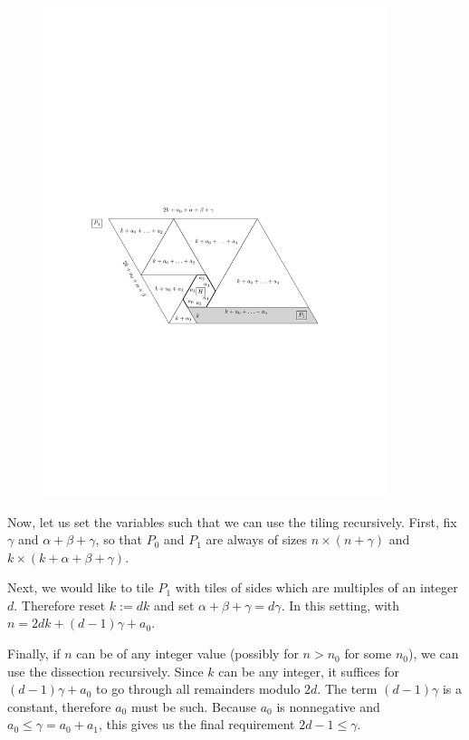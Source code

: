 \begin{figure}[htb]
\centering
\includegraphics[width=0.9\textwidth]{img/core_tiling1.pdf}
\caption{}
\label{fig:core-tiling1}
\end{figure}

Now, let us set the variables such that we can use the tiling recursively. First, fix $\gamma$ and $\alpha+\beta+\gamma$, so that $P_0$ and $P_1$ are always of sizes $n \times (n+\gamma)$ and $k \times (k+\alpha+\beta+\gamma)$.

Next, we would like to tile $P_1$ with tiles of sides which are multiples of an integer $d$. Therefore reset $k := dk$ and set $\alpha+\beta+\gamma = d\gamma$. In this setting,
with $n = 2dk + (d-1)\gamma + a_0$.

Finally, if $n$ can be of any integer value (possibly for $n > n_0$ for some $n_0$), we can use the dissection recursively. Since $k$ can be any integer, it suffices for $(d-1)\gamma + a_0$ to go through all remainders modulo $2d$. The term $(d-1)\gamma$ is a constant, therefore $a_0$ must be such. Because $a_0$ is nonnegative and $a_0 \leq \gamma = a_0 + a_1$, this gives us the final requirement $2d-1 \leq \gamma$.

